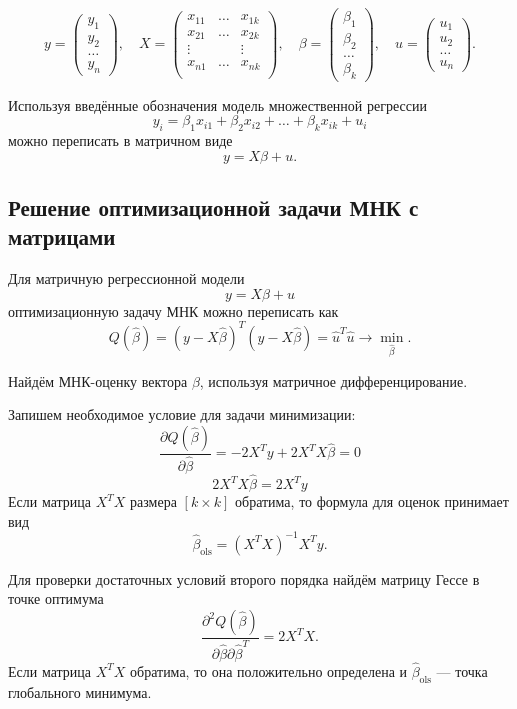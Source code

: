 \documentclass[12pt]{article}
\newcommand{\hb}{\hat{\beta}}
\newcommand{\hu}{\hat{u}}
\newcommand{\ols}{\text{ols}}
\begin{document}
\[
y =  \begin{pmatrix}
y_1 \\
y_2 \\
\dots \\
y_n
 \end{pmatrix},\quad
X = \begin{pmatrix}
    x_{11} & \dots & x_{1k} \\
    x_{21} & \dots & x_{2k} \\
    \vdots &   & \vdots \\
    x_{n1} & \dots & x_{nk} \\
\end{pmatrix}, \quad
\beta = \begin{pmatrix}
    \beta_1\\
    \beta_2\\
    \dots \\
    \beta_k
\end{pmatrix}, \quad
u =  \begin{pmatrix}
u_1 \\
u_2 \\
\dots \\
u_n
 \end{pmatrix}.
\]

Используя введённые обозначения модель множественной регрессии
\[
y_i = \beta_1 x_{i1} + \beta_2 x_{i2} + \dots + \beta_k x_{ik} + u_i
\]
можно переписать в матричном виде
\[
y = X\beta + u.
\]

\subsection{Решение оптимизационной задачи МНК с матрицами}
Для матричную регрессионной модели
\[
y = X\beta + u
\]
оптимизационную задачу МНК можно переписать как
\[
Q(\hb) = (y-X\hb)^T(y-X\hb) = \hu^T\hu \to \underset{\hb}{\min}.
\]

Найдём МНК-оценку вектора $\beta$, используя матричное дифференцирование.

Запишем необходимое условие для задачи минимизации: 
\[
\frac{\partial Q(\hb)}{\partial \hb} = -2X^{T}y + 2X^TX\hb = 0
\]
\[
2X^TX\hb = 2X^{T}y
\]
Если матрица $X^TX$ размера $[k\times k]$ обратима, то формула для оценок принимает вид
\[
\hb_{\ols} = (X^TX)^{-1}X^Ty.
\]

Для проверки достаточных условий второго порядка найдём матрицу Гессе в точке оптимума
\[
\frac{\partial^2 Q(\hb)}{\partial \hb \partial \hb^T} = 2X^TX.
\]
Если матрица $X^TX$ обратима, то она положительно определена и $\hb_{\ols}$ —  точка глобального минимума. 
\end{document}
